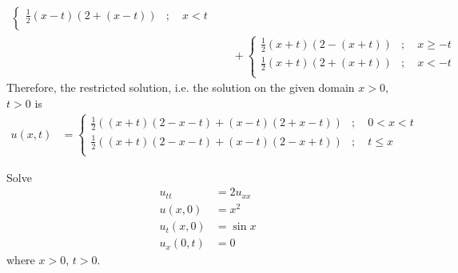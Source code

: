 \documentclass[titlepage, fleqn, a4paper, 12pt, twoside]{article}
\theoremstyle{definition}
\theoremstyle{theorem}
\begin{document}
\begin{solution}
\begin{align*}
\begin{cases}
				\frac{1}{2} (x - t) \left( 2 + (x - t) \right) &;\quad x < t\\
			\end{cases}\\
		&\quad +
			\begin{cases}
				\frac{1}{2} (x + t) \left( 2 - (x + t) \right) &;\quad x \ge -t\\
				\frac{1}{2} (x + t) \left( 2 + (x + t) \right) &;\quad x < -t\\
			\end{cases}
	\end{align*}
	Therefore, the restricted solution, i.e. the solution on the given domain $x > 0$, $t > 0$ is
	\begin{align*}
		u(x,t) &=
			\begin{cases}
				\frac{1}{2} \left( (x + t) (2 - x - t) + (x - t) (2 + x - t) \right) &;\quad 0 < x < t\\
				\frac{1}{2} \left( (x + t) (2 - x - t) + (x - t) (2 - x + t) \right) &;\quad t \le x\\
			\end{cases}
	\end{align*}
\end{solution}

\begin{question}
	Solve
	\begin{align*}
		u_{t t} &= 2 u_{x x}\\
		u(x,0) &= x^2\\
		u_t(x,0) &= \sin x\\
		u_x(0,t) &= 0
	\end{align*}
	where $x > 0$, $t > 0$.
\end{question}
\end{document}
